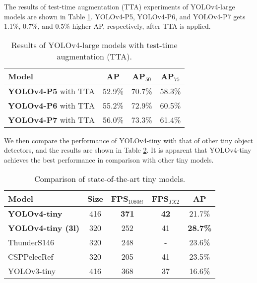 \documentclass[10pt,twocolumn,letterpaper]{article}
\begin{document}
The results of test-time augmentation (TTA) experiments of YOLOv4-large models are shown in Table \ref{table:t13}. YOLOv4-P5, YOLOv4-P6, and YOLOv4-P7 gets 1.1\%, 0.7\%, and 0.5\% higher AP, respectively, after TTA is applied.

\begin{table}[h]
	\centering
	\begin{threeparttable}[h]
		\footnotesize
		\caption{Results of YOLOv4-large models with test-time augmentation (TTA).}
		\label{table:t13}
		\setlength\tabcolsep{3.5pt}
		\begin{tabular}{lccc}
			\toprule
			\textbf{Model} & \textbf{AP} & \textbf{AP$_{50}$} & \textbf{AP$_{75}$} \\				
			\midrule
			\textbf{YOLOv4-P5} with TTA & 52.9\% & 70.7\% & 58.3\% \\
			\textbf{YOLOv4-P6} with TTA & 55.2\% & 72.9\% & 60.5\% \\
			\textbf{YOLOv4-P7} with TTA & 56.0\% & 73.3\% & 61.4\% \\
			\bottomrule
		\end{tabular}
	\end{threeparttable}
\end{table}

We then compare the performance of YOLOv4-tiny with that of other tiny object detectors, and the results are shown in Table \ref{table:t14}.  It is apparent that YOLOv4-tiny achieves the best performance in comparison with other tiny models.

\begin{table}[h]
	\centering
	\begin{threeparttable}[h]
		\footnotesize
		\caption{Comparison of state-of-the-art tiny models.}
		\label{table:t14}
		\setlength\tabcolsep{3.5pt}
		\begin{tabular}{lcccc}
			\toprule
			\textbf{Model} & \textbf{Size} & \textbf{FPS$_{1080ti}$} & \textbf{FPS$_{TX2}$} & \textbf{AP} \\				
			\midrule
			\textbf{YOLOv4-tiny} & 416 & \textbf{371} & \textbf{42} & 21.7\% \\
			\textbf{YOLOv4-tiny (3l)} & 320 & 252 & 41 & \textbf{28.7\%} \\
			ThunderS146 \cite{qin2019thundernet} & 320 & 248 & - & 23.6\% \\
CSPPeleeRef \cite{wang2020cspnet} & 320 & 205 & 41 & 23.5\% \\
			YOLOv3-tiny \cite{redmon2018yolov3} & 416 & 368 & 37 & 16.6\% \\
			\bottomrule
		\end{tabular}
	\end{threeparttable}
\end{table}
\end{document}

